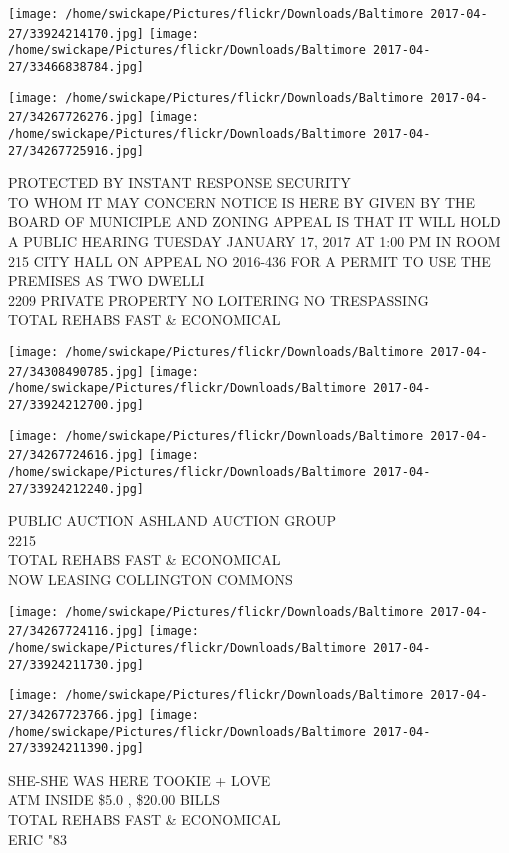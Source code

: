 \documentclass[10pt,letterpaper]{article}
\begin{document}
\texttt{[image: /home/swickape/Pictures/flickr/Downloads/Baltimore 2017-04-27/33924214170.jpg]}
\texttt{[image: /home/swickape/Pictures/flickr/Downloads/Baltimore 2017-04-27/33466838784.jpg]}

\texttt{[image: /home/swickape/Pictures/flickr/Downloads/Baltimore 2017-04-27/34267726276.jpg]}
\texttt{[image: /home/swickape/Pictures/flickr/Downloads/Baltimore 2017-04-27/34267725916.jpg]}

PROTECTED BY INSTANT RESPONSE SECURITY\\
TO WHOM IT MAY CONCERN NOTICE IS HERE BY GIVEN BY THE BOARD OF MUNICIPLE AND ZONING APPEAL IS THAT IT WILL HOLD A PUBLIC HEARING TUESDAY JANUARY 17, 2017 AT 1:00 PM IN ROOM 215 CITY HALL ON APPEAL NO 2016{-}436 FOR A PERMIT TO USE THE PREMISES AS TWO DWELLI\\
2209 PRIVATE PROPERTY NO LOITERING NO TRESPASSING\\
TOTAL REHABS FAST \& ECONOMICAL\\
\pagebreak

\texttt{[image: /home/swickape/Pictures/flickr/Downloads/Baltimore 2017-04-27/34308490785.jpg]}
\texttt{[image: /home/swickape/Pictures/flickr/Downloads/Baltimore 2017-04-27/33924212700.jpg]}

\texttt{[image: /home/swickape/Pictures/flickr/Downloads/Baltimore 2017-04-27/34267724616.jpg]}
\texttt{[image: /home/swickape/Pictures/flickr/Downloads/Baltimore 2017-04-27/33924212240.jpg]}

PUBLIC AUCTION ASHLAND AUCTION GROUP\\
2215\\
TOTAL REHABS FAST \& ECONOMICAL\\
NOW LEASING COLLINGTON COMMONS\\
\pagebreak

\texttt{[image: /home/swickape/Pictures/flickr/Downloads/Baltimore 2017-04-27/34267724116.jpg]}
\texttt{[image: /home/swickape/Pictures/flickr/Downloads/Baltimore 2017-04-27/33924211730.jpg]}

\texttt{[image: /home/swickape/Pictures/flickr/Downloads/Baltimore 2017-04-27/34267723766.jpg]}
\texttt{[image: /home/swickape/Pictures/flickr/Downloads/Baltimore 2017-04-27/33924211390.jpg]}

SHE{-}SHE WAS HERE TOOKIE + LOVE\\
ATM INSIDE \$5.0 , \$20.00 BILLS\\
TOTAL REHABS FAST \& ECONOMICAL\\
ERIC "83\\
\pagebreak
\end{document}
